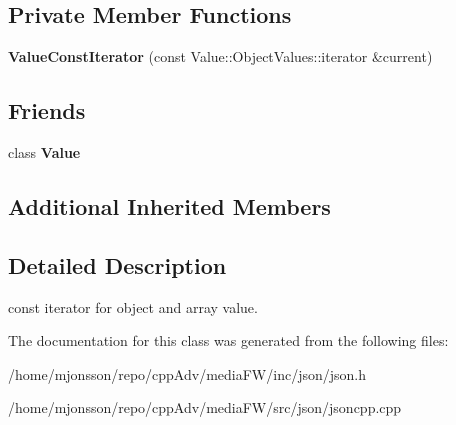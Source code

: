 \subsection*{Private Member Functions}
\begin{DoxyCompactItemize}
\item 
\mbox{\label{classJson_1_1ValueConstIterator_aa0a87edf5f1097f91dca5f2a389c4abd}} 
{\bfseries Value\+Const\+Iterator} (const Value\+::\+Object\+Values\+::iterator \&current)
\end{DoxyCompactItemize}
\subsection*{Friends}
\begin{DoxyCompactItemize}
\item 
\mbox{\label{classJson_1_1ValueConstIterator_aeceedf6e1a7d48a588516ce2b1983d6f}} 
class {\bfseries Value}
\end{DoxyCompactItemize}
\subsection*{Additional Inherited Members}


\subsection{Detailed Description}
const iterator for object and array value. 



The documentation for this class was generated from the following files\+:\begin{DoxyCompactItemize}
\item 
/home/mjonsson/repo/cpp\+Adv/media\+F\+W/inc/json/json.\+h\item 
/home/mjonsson/repo/cpp\+Adv/media\+F\+W/src/json/jsoncpp.\+cpp\end{DoxyCompactItemize}
